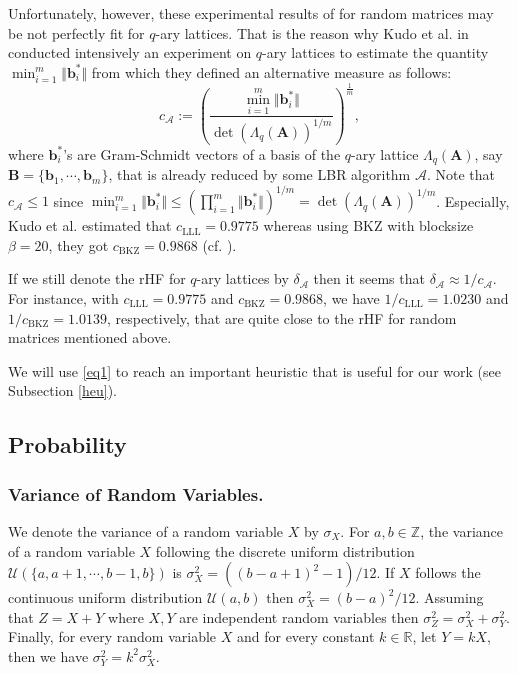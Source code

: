 \documentclass[runningheads]{llncs}
\begin{document}
Unfortunately, however, these experimental results of \cite{GM08} for random matrices may be not perfectly fit for $q$-ary lattices. That is the reason why Kudo et al. in \cite{KYGY16} conducted intensively an experiment on $q$-ary lattices to estimate the quantity $\min_{i=1}^{m}\Vert \mathbf{b}_i^* \Vert$ from which they defined an alternative measure as follows:
\begin{equation}\label{eq1}
c_{\mathcal{A}}:=\left( \frac{\min_{i=1}^{m}\Vert \mathbf{b}_i^* \Vert}{\det(\Lambda_q{(\mathbf{A})})^{1/m}}\right)^{\frac{1}{m}},
\end{equation}
where $\mathbf{b}_i^*$'s are Gram-Schmidt vectors of a basis of the $q$-ary lattice $\Lambda_q{(\mathbf{A})}$, say $\mathbf{B}=\{ \mathbf{b}_1,\cdots,\mathbf{b}_{m}\}$, that is already reduced by some LBR algorithm $\mathcal{A} $. Note that $c_{\mathcal{A}} \leq 1$ since $\min_{i=1}^{m}\Vert \mathbf{b}_i^* \Vert \leq (\prod_{i=1}^{m}\Vert \mathbf{b}_i^* \Vert)^{1/m} =\det(\Lambda_q{(\mathbf{A})})^{1/m} $. Especially, Kudo et al. \cite{KYGY16} estimated that
	$c_{\text{LLL}}=0.9775$
	whereas using BKZ with blocksize $\beta=20$, they got 
	$c_{\text{BKZ}}=0.9868$ (cf. \cite[Table 1]{KYGY16}).

If we still denote the rHF for $q$-ary lattices by $\delta_{\mathcal{A}}$ then it seems that $\delta_{\mathcal{A}} \approx 1/c_{\mathcal{A}}$. For instance, with $c_{\text{LLL}}=0.9775$ and $c_{\text{BKZ}}=0.9868$, we have $1/c_{\text{LLL}}=1.0230$ and $1/c_{\text{BKZ}}=1.0139$, respectively, that are quite close to the rHF for random matrices mentioned above.

We will use \eqref{eq1} to reach an important heuristic that is useful for our work (see Subsection \ref{heu}).

\subsection{Probability}

 \subsubsection{Variance of Random Variables.}
 We denote the variance of a random variable $X$ by $\sigma_X$.
  For $a, b \in \mathbb{Z}$, the variance of a random variable $X$ following the discrete uniform distribution $\mathcal{U}(\{a, a+1,\cdots, b-1,b\})$ is 
	$\sigma_{X}^2=((b-a+1)^2-1)/12$. 
	If $X$ follows the continuous uniform distribution $\mathcal{U}(a,b)$ then
	$\sigma_{X}^2=(b-a)^2/12.$ Assuming that $Z=X+Y$ where $X,Y $ are independent random variables then $\sigma^2_Z=\sigma^2_X+\sigma^2_Y.$ Finally, for every random variable $X$ and for every constant $k\in \mathbb{R}$, let $Y=kX$, then we have
	$\sigma^2_Y=k^2\sigma^2_{X}$.
	
\end{document}
